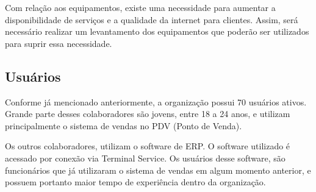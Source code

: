 \documentclass[	DIV=calc,%
							paper=a4,%
							fontsize=12pt,%
							onecolumn]{scrartcl}	 					%
\begin{document}
Com relação aos equipamentos, existe uma necessidade para aumentar a disponibilidade de serviços e a qualidade da internet para clientes. Assim, será necessário realizar um levantamento dos equipamentos que poderão ser utilizados para suprir essa necessidade.

 

\subsection{Usuários}
Conforme já mencionado anteriormente, a organização possui 70 usuários ativos. Grande parte desses colaboradores são jovens, entre 18 a 24 anos, e utilizam principalmente o sistema de vendas no PDV (Ponto de Venda).

Os outros colaboradores, utilizam o software de ERP. O software utilizado é acessado por conexão via Terminal Service. Os usuários desse software, são funcionários que já utilizaram o sistema de vendas em algum momento anterior, e possuem portanto maior tempo de experiência dentro da organização.
\end{document}
